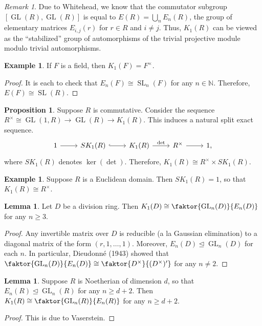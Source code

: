 \documentclass[10pt,letterpaper,cm]{nupset}
\theoremstyle{definition}
\newtheorem{exmp}[definition]{Example}
\theoremstyle{theorem}
\newtheorem{lemma}[definition]{Lemma}
\newtheorem{prop}[definition]{Proposition}
\theoremstyle{remark}
\newtheorem{remark}[definition]{Remark}
\newcommand{\N}{\mathbb N}
\newcommand{\1}{\mathbf{1}}
\newcommand{\0}{\vec 0}
\DeclareMathOperator*{\GL}{GL}
\DeclareMathOperator*{\SL}{SL}
\begin{document}
\begin{remark}
Due to Whitehead, we know that the commutator subgroup $[\GL(R), \GL(R)]$ is equal to $E(R) = \bigcup_n E_n(R)$, the group of elementary matrices $E_{i, j}(r)$ for $r \in R$ and $i\ne j$. Thus, $K_1(R)$ can be viewed as the ``stabilized'' group of automorphisms of the trivial projective module modulo trivial automorphisms.
\end{remark}

\begin{exmp}
If $F$ is a field, then $K_1(F) = F^{\times}$.
\end{exmp}
\begin{proof}
It is each to check that $E_n(F) \cong \SL_n(F)$ for any $n\in \N$. Therefore, $E(F) \cong \SL(R)$.
\end{proof}

\begin{prop}
Suppose $R$ is commutative. Consider the sequence $R^{\times} \cong \GL(1, R) \to \GL(R) \to K_1(R)$. This induces a natural split exact sequence.
\[
\begin{tikzcd}
1 \arrow[r] & SK_1(R) \arrow[r, hook] & K_1(R) \arrow[r, "\det"] & R^{\times} \arrow[r] & 1,
\end{tikzcd}
\]
where $SK_1(R)$ denotes $\ker(\det)$. Therefore, $K_1(R) \cong R^{\times} \times SK_1(R)$.
\end{prop}

\begin{exmp}
Suppose $R$ is a Euclidean domain. Then $SK_1(R) =1$, so that $K_1(R) \cong R^{\times}$.
\end{exmp}

\begin{lemma}
Let $D$ be a division ring. Then $K_1(D) \cong \faktor{\GL_n(D)}{E_n(D)}$ for any $n\geq 3$.
\end{lemma}
\begin{proof}
Any invertible matrix over $D$ is reducible (a la Gaussian elimination) to a diagonal matrix of the form $(r, 1, \ldots, 1)$. Moreover, $E_n(D)\unlhd \GL_n(D)$ for each $n$. In particular, Dieudonn\'e (1943) showed that  $\faktor{\GL_n(D)}{E_n(D)} \cong \faktor{D^{\times}}{(D^{\times})'}$ for any $n\ne 2$. 
\end{proof}

\begin{lemma}
Suppose $R$ is Noetherian of dimension $d$, so that $E_n(R)\unlhd \GL_n(R)$ for any $n\geq d+2$. Then $K_1(R) \cong \faktor{\GL_n(R)}{E_n(R)}$ for any $n \geq d+2$. 
\end{lemma}
\begin{proof}
This is due to Vaserstein.
\end{proof}
\end{document}
